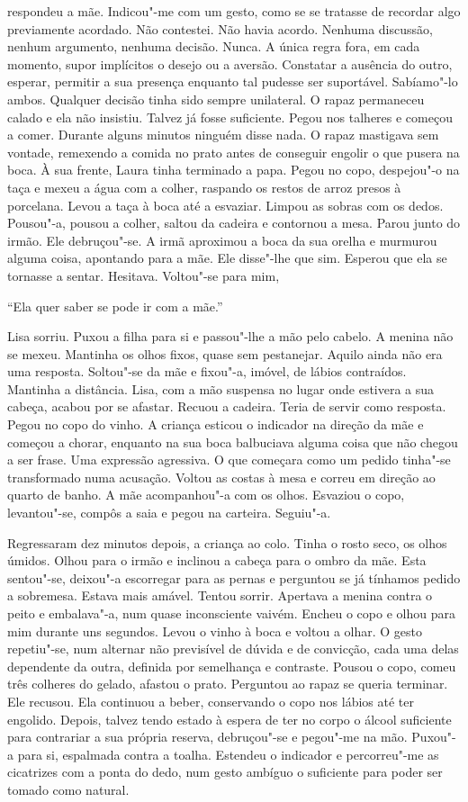 respondeu a mãe. Indicou"-me com um gesto, como se se tratasse de
recordar algo previamente acordado. Não contestei. Não havia acordo.
Nenhuma discussão, nenhum argumento, nenhuma decisão. Nunca. A única
regra fora, em cada momento, supor implícitos o desejo ou a aversão.
Constatar a ausência do outro, esperar, permitir a sua presença enquanto
tal pudesse ser suportável. Sabíamo"-lo ambos. Qualquer decisão tinha
sido sempre unilateral. O rapaz permaneceu calado e ela não insistiu.
Talvez já fosse suficiente. Pegou nos talheres e começou a comer.
Durante alguns minutos ninguém disse nada. O rapaz mastigava sem
vontade, remexendo a comida no prato antes de conseguir engolir o que
pusera na boca. À sua frente, Laura tinha terminado a papa. Pegou no
copo, despejou"-o na taça e mexeu a água com a colher, raspando os
restos de arroz presos à porcelana. Levou a taça à boca até a esvaziar.
Limpou as sobras com os dedos. Pousou"-a, pousou a colher, saltou da
cadeira e contornou a mesa. Parou junto do irmão. Ele debruçou"-se. A
irmã aproximou a boca da sua orelha e murmurou alguma coisa, apontando
para a mãe. Ele disse"-lhe que sim. Esperou que ela se tornasse a
sentar. Hesitava. Voltou"-se para mim,

``Ela quer saber se pode ir com a mãe.''

Lisa sorriu. Puxou a filha para si e passou"-lhe a mão pelo cabelo. A
menina não se mexeu. Mantinha os olhos fixos, quase sem pestanejar.
Aquilo ainda não era uma resposta. Soltou"-se da mãe e fixou"-a, imóvel,
de lábios contraídos. Mantinha a distância. Lisa, com a mão suspensa no
lugar onde estivera a sua cabeça, acabou por se afastar. Recuou a
cadeira. Teria de servir como resposta. Pegou no copo do vinho. A
criança esticou o indicador na direção da mãe e começou a chorar,
enquanto na sua boca balbuciava alguma coisa que não chegou a ser frase.
Uma expressão agressiva. O que começara como um pedido tinha"-se
transformado numa acusação. Voltou as costas à mesa e correu em direção
ao quarto de banho. A mãe acompanhou"-a com os olhos. Esvaziou o copo,
levantou"-se, compôs a saia e pegou na carteira. Seguiu"-a.

Regressaram dez minutos depois, a criança ao colo. Tinha o rosto seco,
os olhos úmidos. Olhou para o irmão e inclinou a cabeça para o ombro da
mãe. Esta sentou"-se, deixou"-a escorregar para as pernas e perguntou se
já tínhamos pedido a sobremesa. Estava mais amável. Tentou sorrir.
Apertava a menina contra o peito e embalava"-a, num quase inconsciente
vaivém. Encheu o copo e olhou para mim durante uns segundos. Levou o
vinho à boca e voltou a olhar. O gesto repetiu"-se, num alternar não
previsível de dúvida e de convicção, cada uma delas dependente da outra,
definida por semelhança e contraste. Pousou o copo, comeu três colheres
do gelado, afastou o prato. Perguntou ao rapaz se queria terminar. Ele
recusou. Ela continuou a beber, conservando o copo nos lábios até ter
engolido. Depois, talvez tendo estado à espera de ter no corpo o álcool
suficiente para contrariar a sua própria reserva, debruçou"-se e
pegou"-me na mão. Puxou"-a para si, espalmada contra a toalha. Estendeu
o indicador e percorreu"-me as cicatrizes com a ponta do dedo, num gesto
ambíguo o suficiente para poder ser tomado como natural.

